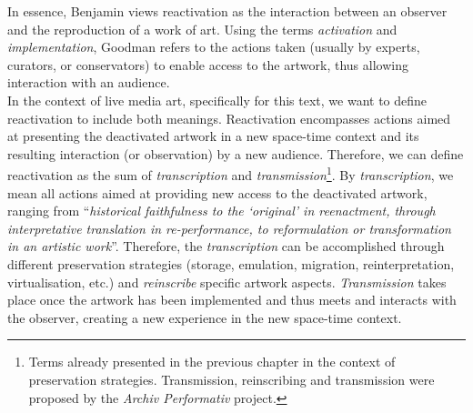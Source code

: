 In essence, Benjamin views reactivation as the interaction between an observer and the reproduction of a work of art. Using the terms \textit{activation} and \textit{implementation}, Goodman refers to the actions taken (usually by experts, curators, or conservators) to enable access to the artwork, thus allowing interaction with an audience.\\
In the context of live media art, specifically for this text, we want to define reactivation to include both meanings. Reactivation encompasses actions aimed at presenting the deactivated artwork in a new space-time context and its resulting interaction (or observation) by a new audience. Therefore, we can define reactivation as the sum of \textit{transcription} and \textit{transmission}\footnote{Terms already presented in the previous chapter in the context of preservation strategies. Transmission, reinscribing and transmission were proposed by the \textit{Archiv Performativ} project.}. By \textit{transcription}, we mean all actions aimed at providing new access to the deactivated artwork, ranging from ``\textit{historical faithfulness to the ‘original’ in reenactment, through interpretative translation in re-performance, to reformulation or transformation in an artistic work}''. Therefore, the \textit{transcription} can be accomplished through different preservation strategies (storage, emulation, migration, reinterpretation, virtualisation, etc.) and \textit{reinscribe} specific artwork aspects. \textit{Transmission} takes place once the artwork has been implemented and thus meets and interacts with the observer, creating a new experience in the new space-time context.

